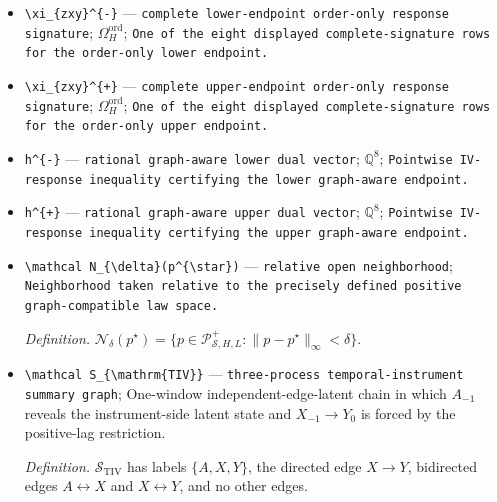 \documentclass{article}
\begin{document}
\begin{itemize}
  \item \texttt{\textbackslash{}\allowbreak{}xi\_\allowbreak{}\{zxy\}\allowbreak{}\textasciicircum{}\{-\allowbreak{}\}\allowbreak{}} --- \texttt{complete lower-\allowbreak{}endpoint order-\allowbreak{}only response signature}; \(\Omega_H^{\mathrm{ord}}\); \texttt{One of the eight displayed complete-\allowbreak{}signature rows for the order-\allowbreak{}only lower endpoint.}
  \item \texttt{\textbackslash{}\allowbreak{}xi\_\allowbreak{}\{zxy\}\allowbreak{}\textasciicircum{}\{+\allowbreak{}\}\allowbreak{}} --- \texttt{complete upper-\allowbreak{}endpoint order-\allowbreak{}only response signature}; \(\Omega_H^{\mathrm{ord}}\); \texttt{One of the eight displayed complete-\allowbreak{}signature rows for the order-\allowbreak{}only upper endpoint.}
  \item \texttt{h\textasciicircum{}\{-\allowbreak{}\}\allowbreak{}} --- \texttt{rational graph-\allowbreak{}aware lower dual vector}; \(\mathbb Q^{8}\); \texttt{Pointwise IV-\allowbreak{}response inequality certifying the lower graph-\allowbreak{}aware endpoint.}
  \item \texttt{h\textasciicircum{}\{+\allowbreak{}\}\allowbreak{}} --- \texttt{rational graph-\allowbreak{}aware upper dual vector}; \(\mathbb Q^{8}\); \texttt{Pointwise IV-\allowbreak{}response inequality certifying the upper graph-\allowbreak{}aware endpoint.}
  \item \texttt{\textbackslash{}\allowbreak{}mathcal N\_\allowbreak{}\{\textbackslash{}\allowbreak{}delta\}\allowbreak{}(p\textasciicircum{}\{\textbackslash{}\allowbreak{}star\}\allowbreak{})} --- \texttt{relative open neighborhood}; \texttt{Neighborhood taken relative to the precisely defined positive graph-\allowbreak{}compatible law space.}
  \par\smallskip\noindent\emph{Definition.} \(\mathcal N_{\delta}(p^{\star})=\{p\in\mathcal P_{\mathcal S,H,L}^{+}:\|p-p^{\star}\|_{\infty}<\delta\}\).
  \item \texttt{\textbackslash{}\allowbreak{}mathcal S\_\allowbreak{}\{\textbackslash{}\allowbreak{}mathrm\{TIV\}\allowbreak{}\}\allowbreak{}} --- \texttt{three-\allowbreak{}process temporal-\allowbreak{}instrument summary graph}; One-window independent-edge-latent chain in which \(A_{-1}\) reveals the instrument-side latent state and \(X_{-1}\to Y_0\) is forced by the positive-lag restriction.
  \par\smallskip\noindent\emph{Definition.} \(\mathcal S_{\mathrm{TIV}}\) has labels \(\{A,X,Y\}\), the directed edge \(X\to Y\), bidirected edges \(A\leftrightarrow X\) and \(X\leftrightarrow Y\), and no other edges.

\end{itemize}
\end{document}
